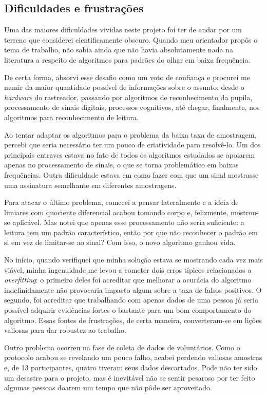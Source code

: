 \documentclass[12pt]{article}
\begin{document}
		\subsection{Dificuldades e frustrações}
		Uma das maiores dificuldades vividas neste projeto foi ter de andar por um terreno que considerei cientificamente obscuro. Quando meu orientador propôs o tema de trabalho, não sabia ainda que não havia absolutamente nada na literatura a respeito de algoritmos para padrões do olhar em baixa frequência.
		
		De certa forma, absorvi esse desafio como um voto de confiança e procurei me munir da maior quantidade possível de informações sobre o assunto: desde o \textit{hardware} do rastreador, passando por algoritmos de reconhecimento da pupila, processamento de sinais digitais, processos cognitivos, até chegar, finalmente, nos algoritmos para reconhecimento de leitura.
		
		Ao tentar adaptar os algoritmos para o problema da baixa taxa de amostragem, percebi que seria necessário ter um pouco de criatividade para resolvê-lo. Um dos principais entraves estava no fato de todos os algoritmos estudados se apoiarem apenas no processamento de sinais, o que se torna problemático em baixas frequências. Outra dificuldade estava em como fazer com que um sinal mostrasse uma assinatura semelhante em diferentes amostragens.
		
		Para atacar o último problema, comecei a pensar lateralmente e a ideia de limiares com quociente diferencial acabou tomando corpo e, felizmente, mostrou-se aplicável. Mas notei que apenas esse processamento não seria suficiente: a leitura tem um padrão característico, então por que não reconhecer o padrão em si em vez de limitar-se ao sinal? Com isso, o novo algoritmo ganhou vida.
		
		No início, quando verifiquei que minha solução estava se mostrando cada vez mais viável, minha ingenuidade me levou a cometer dois erros típicos relacionados a \textit{overfitting}: o primeiro deles foi acreditar que melhorar a acurácia do algoritmo indefinidamente não provocaria impacto algum sobre a taxa de falsos positivos. O segundo, foi acreditar que trabalhando com apenas dados de uma pessoa já seria possível adquirir evidências fortes o bastante para um bom comportamento do algoritmo. Essas fontes de frustrações, de certa maneira, converteram-se em lições valiosas para dar robustez ao trabalho.
		
		Outro problema ocorreu na fase de coleta de dados de voluntários. Como o protocolo acabou se revelando um pouco falho, acabei perdendo valiosas amostras e, de 13 participantes, quatro tiveram seus dados descartados. Pode não ter sido um desastre para o projeto, mas é inevitável não se sentir pesaroso por ter feito algumas pessoas doarem um tempo que não pôde ser aproveitado.
		
\end{document}
